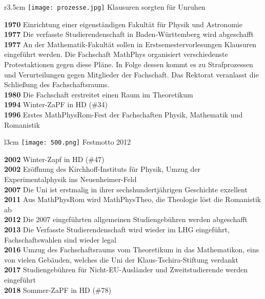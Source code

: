 \begin{wrapfigure}{r}{3.5cm}
\vspace{-13pt}
\texttt{[image: prozesse.jpg]}
\small{Klausuren sorgten für Unruhen}
\vspace{5pt}
\end{wrapfigure}

\textbf{1970} Einrichtung einer eigenständigen Fakultät für Physik und Astronomie\\
\textbf{1977} Die verfasste Studierendenschaft in Baden-Württemberg wird abgeschafft\\
\textbf{1977} An der Mathematik-Fakultät sollen in Erstsemestervorlesungen Klausuren eingeführt werden.
Die Fachschaft MathPhys organisiert verschiedenste Protestaktionen gegen diese Pläne. In Folge dessen kommt es zu Strafprozessen und Verurteilungen gegen Mitglieder der Fachschaft. Das Rektorat veranlasst die Schließung des Fachschaftsraums.\\
\textbf{1980} Die Fachschaft erstreitet einen Raum im Theoretikum\\
\textbf{1994} Winter-ZaPF in HD (\#34)\\
\textbf{1996} Erstes MathPhysRom-Fest der Fachschaften Physik, Mathematik und Romanistik

\begin{wrapfigure}{l}{3cm}
\texttt{[image: 500.png]}
\small{Festmotto 2012}
\end{wrapfigure}
\textbf{2002} Winter-Zapf in HD (\#47)\\
\textbf{2002} Eröffnung des Kirchhoff-Instituts für Physik, Umzug der Experimentalphysik ins Neuenheimer-Feld\\
\textbf{2007} Die Uni ist erstmalig in ihrer sechshundertjährigen Geschichte exzellent\\
\textbf{2011} Aus MathPhysRom wird MathPhysTheo, die Theologie löst die Romanistik ab\\
\textbf{2012} Die 2007 eingeführten allgemeinen Studiengebühren werden abgeschafft\\
\textbf{2013} Die Verfasste Studierendenschaft wird wieder im LHG eingeführt, Fachschaftswahlen sind wieder legal\\
\textbf{2016} Umzug des Fachschaftsraums vom Theoretikum in das Mathematikon, eins von vielen Gebäuden, welches die Uni der Klaus-Tschira-Stiftung verdankt\\
\textbf{2017} Studiengebühren für Nicht-EU-Ausländer und Zweitstudierende werden eingeführt\\
\textbf{2018} Sommer-ZaPF in HD (\#78)
